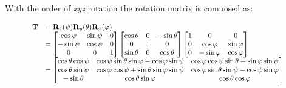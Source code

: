         With the order of \textit{xyz} rotation the rotation matrix is
        composed as:

        \begin{equation}
            \scalebox{0.85}{
                $ \begin{array}{ll}
                    \mathbf{T}
                    &= \mathbf{R}_{z}(\psi)\mathbf{R}_{y}(\theta)\mathbf{R}_{x}(\varphi) \\
                    &=
                    \begin{bmatrix}
                        \cos \psi & \sin \psi & 0 \\
                        -\sin \psi & \cos \psi & 0 \\
                        0 & 0 & 1
                    \end{bmatrix}
                    \begin{bmatrix}
                        \cos \theta & 0 & -\sin \theta \\
                        0 & 1 & 0 \\
                        \sin \theta & 0 & \cos \theta
                    \end{bmatrix}
                    \begin{bmatrix}
                        1 & 0 & 0 \\
                        0 & \cos \varphi & \sin \varphi \\
                        0 & -\sin \varphi & \cos \varphi
                    \end{bmatrix} \\
                    &=
                    \begin{bmatrix}
                        \cos \theta \cos \psi
                        & \cos \psi \sin \theta \sin \varphi - \cos \varphi \sin \psi
                        & \cos \varphi \cos \psi \sin \theta + \sin \varphi \sin \psi \\
                        \cos \theta \sin \psi
                        & \cos \varphi \cos \psi + \sin \theta \sin \varphi \sin \psi
                        & \cos \varphi \sin \theta \sin \psi - \cos \psi \sin \varphi \\
                        -\sin \theta
                        & \cos \theta \sin \varphi
                        & \cos \theta \cos \varphi
                    \end{bmatrix}
                \end{array} $
            }
        \end{equation}

